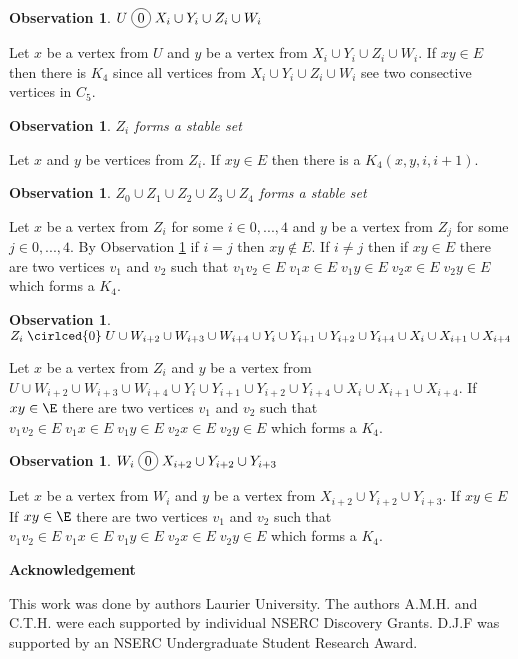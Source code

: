 \documentclass[12pt]{article}
\newcommand*\circled[1]{\tikz[baseline=(char.base)]{
            \node[shape=circle,draw,inner sep=2pt] (char) {#1};}}
\newtheorem{Observation}[Theorem]{Observation}
\begin{document}
\begin{Observation}\label{obs:U-co-joins}
$U \;\circled{0}\; X_i \cup Y_i \cup Z_i \cup W_i$
\end{Observation}
 Let $x$ be a vertex from $U$ and $y$ be a vertex from $X_i \cup Y_i \cup Z_i \cup W_i$. If $xy \in E$ then there is $K_4$ since all vertices from $X_i \cup Y_i \cup Z_i \cup W_i$ see two consective vertices in $C_5$.

\begin{Observation}\label{obs:Zi-stable}
$Z_i$ forms a stable set
\end{Observation}
 Let $x$ and $y$ be vertices from $Z_i$. If $xy \in E$ then there is a $K_4(x, y, i, i+1)$.

\begin{Observation}\label{obs:all-zi-stable}
$Z_0 \cup Z_1 \cup Z_2 \cup Z_3 \cup Z_4$ forms a stable set
\end{Observation}
 Let $x$ be a vertex from $Z_i$ for some $i \in {0,...,4}$ and $y$ be a vertex from $Z_j$ for some $j \in {0,...,4}$. By Observation \ref{obs:Zi-stable} if $i = j$ then $xy \not \in E$. If $i \neq j$ then if $xy \in E$ there are two vertices $v_1$ and $v_2$ such that $v_1v_2\in E\; v_1x \in E\; v_1y \in E\; v_2x \in E\; v_2y \in E$ which forms a $K_4$.

\begin{Observation}\label{obs:zi-co-joins}
$Z_i \;\cirlced{0}\; U \cup W_{i+2} \cup W_{i+3} \cup W_{i+4} \cup Y_{i} \cup Y_{i+1} \cup Y_{i+2} \cup Y_{i+4} \cup X_{i} \cup X_{i+1} \cup X_{i+4} $
\end{Observation}
 Let $x$ be a vertex from $Z_i$ and $y$ be a vertex from $U \cup W_{i+2} \cup W_{i+3} \cup W_{i+4} \cup Y_{i} \cup Y_{i+1} \cup Y_{i+2} \cup Y_{i+4} \cup X_{i} \cup X_{i+1} \cup X_{i+4}$. If $xy \in \E$ there are two vertices $v_1$ and $v_2$ such that $v_1v_2\in E\; v_1x \in E\; v_1y \in E\; v_2x \in E\; v_2y \in E$ which forms a $K_4$. 

\begin{Observation}\label{obs:wi-co-joins}
$W_i \;\circled{0}\; X_{i+2} \cup Y_{i+2} \cup Y_{i+3}$
\end{Observation}
 Let $x$ be a vertex from $W_i$ and $y$ be a vertex from $X_{i+2} \cup Y_{i+2} \cup Y_{i+3}$. If $xy \in E$ If $xy \in \E$ there are two vertices $v_1$ and $v_2$ such that $v_1v_2\in E\; v_1x \in E\; v_1y \in E\; v_2x \in E\; v_2y \in E$ which forms a $K_4$. 

\begin{center}
{\bf Acknowledgement}
\end{center}
This work was done by authors  Laurier University. The authors A.M.H. and C.T.H. were each supported by individual NSERC Discovery Grants. D.J.F was supported by an NSERC Undergraduate Student Research Award.


\clearpage
\begin{thebibliography}{99}

\end{thebibliography}
\end{document}
